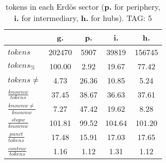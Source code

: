 \begin{table}[h!]
\begin{center}
\begin{tabular}{| l | c | c | c | c |}\hline
 & g. & p. & i. & h. \\\hline
$tokens$ & 202470  & 5907  & 39819  & 156745 \\\hline
$tokens_{\%}$ & 100.00  & 2.92  & 19.67  & 77.42 \\\hline
$tokens \neq$ & 4.73  & 26.36  & 10.85  & 5.24 \\\hline
$\frac{knownw}{tokens}$ & 37.45  & 38.67  & 36.63  & 37.61 \\\hline
$\frac{knownw \neq}{knownw}$ & 7.27  & 47.42  & 19.62  & 8.28 \\\hline
$\frac{stopw}{knownw}$ & 101.81  & 99.52  & 104.64  & 101.20 \\\hline
$\frac{punct}{tokens}$ & 17.48  & 15.91  & 17.03  & 17.65 \\\hline
$\frac{contrac}{tokens}$ & 1.16  & 1.12  & 1.31  & 1.12 \\\hline
\end{tabular}
\caption{tokens in each Erd\"os sector ({{\bf p.}} for periphery, {{\bf i.}} for intermediary, 
    {{\bf h.}} for hubs). TAG: 5}
\end{center}
\end{table}